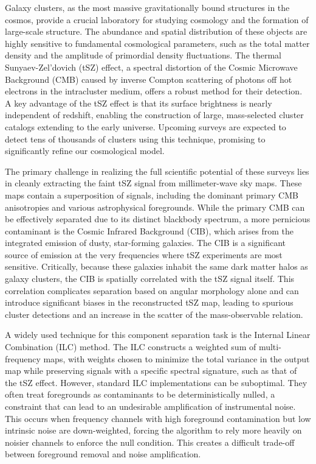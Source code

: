 \documentclass[]{article}
\begin{document}
Galaxy clusters, as the most massive gravitationally bound structures in the cosmos, provide a crucial laboratory for studying cosmology and the formation of large-scale structure. The abundance and spatial distribution of these objects are highly sensitive to fundamental cosmological parameters, such as the total matter density and the amplitude of primordial density fluctuations. The thermal Sunyaev-Zel'dovich (tSZ) effect, a spectral distortion of the Cosmic Microwave Background (CMB) caused by inverse Compton scattering of photons off hot electrons in the intracluster medium, offers a robust method for their detection. A key advantage of the tSZ effect is that its surface brightness is nearly independent of redshift, enabling the construction of large, mass-selected cluster catalogs extending to the early universe. Upcoming surveys are expected to detect tens of thousands of clusters using this technique, promising to significantly refine our cosmological model.

The primary challenge in realizing the full scientific potential of these surveys lies in cleanly extracting the faint tSZ signal from millimeter-wave sky maps. These maps contain a superposition of signals, including the dominant primary CMB anisotropies and various astrophysical foregrounds. While the primary CMB can be effectively separated due to its distinct blackbody spectrum, a more pernicious contaminant is the Cosmic Infrared Background (CIB), which arises from the integrated emission of dusty, star-forming galaxies. The CIB is a significant source of emission at the very frequencies where tSZ experiments are most sensitive. Critically, because these galaxies inhabit the same dark matter halos as galaxy clusters, the CIB is spatially correlated with the tSZ signal itself. This correlation complicates separation based on angular morphology alone and can introduce significant biases in the reconstructed tSZ map, leading to spurious cluster detections and an increase in the scatter of the mass-observable relation.

A widely used technique for this component separation task is the Internal Linear Combination (ILC) method. The ILC constructs a weighted sum of multi-frequency maps, with weights chosen to minimize the total variance in the output map while preserving signals with a specific spectral signature, such as that of the tSZ effect. However, standard ILC implementations can be suboptimal. They often treat foregrounds as contaminants to be deterministically nulled, a constraint that can lead to an undesirable amplification of instrumental noise. This occurs when frequency channels with high foreground contamination but low intrinsic noise are down-weighted, forcing the algorithm to rely more heavily on noisier channels to enforce the null condition. This creates a difficult trade-off between foreground removal and noise amplification.
\end{document}
